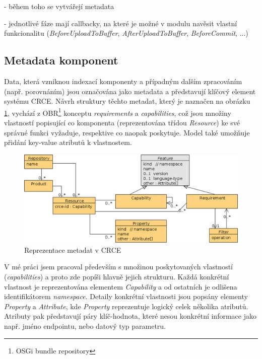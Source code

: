 \documentclass[czech,DP]{thesiskiv}
\begin{document}
 - během toho se vytvářejí metadata
 
 - jednotlivé fáze mají callbacky, na které je možné v modulu navěsit vlastní funkcionalitu (\textit{BeforeUploadToBuffer}, \textit{AfterUploadToBuffer}, \textit{BeforeCommit}, ...)


\subsection{Metadata komponent}
\label{subsec:crce-metadata}

Data, která vzniknou indexací komponenty a případným dalším zpracováním (např. porovnáním) jsou označována jako metadata a představují klíčový element systému CRCE. Návrh struktury těchto metadat, který je naznačen na obrázku \ref{fig:crce-resource-uml}, vychází z OBR\footnote{OSGi bundle repository} konceptu \textit{requirements} a \textit{capabilities}\cite{brada2015repository}, což jsou množiny vlastností popisující co komponenta (reprezentována třídou \textit{Resource}) ke své správné funkci vyžaduje, respektive co naopak poskytuje. Model také umožňuje přidání key-value atributů k vlastnostem.
 
 \begin{figure}[h]
 	\centering
 	\includegraphics{resource-uml}
 	\caption{Reprezentace metadat v CRCE}
 	\label{fig:crce-resource-uml}
 \end{figure}

V mé práci jsem pracoval především s množinou poskytovaných vlastností (\textit{capabilities}) a proto zde popíši hlavně jejich strukturu. Každá konkrétní vlastnost je reprezentována elementem \textit{Capability} a od ostatních je odlišena identifikátorem \textit{namespace}. Detaily konkrétní vlastnosti jsou popsány elementy \textit{Property} a \textit{Attribute}, kde \textit{Property} reprezentuje logický celek několika atributů. Atributy pak představují páry klíč-hodnota, které nesou konkrétní informace jako např. jméno endpointu, nebo datový typ parametru.
\end{document}
